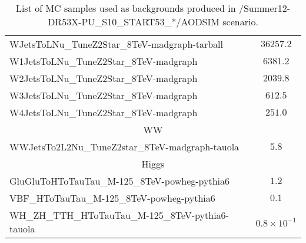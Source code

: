 \begin{table}[!Hhtb]
\begin{center}
{\begin{tabular}{|l|c|}
WJetsToLNu\_TuneZ2Star\_8TeV-madgraph-tarball          &  $36257.2$              \\
W1JetsToLNu\_TuneZ2Star\_8TeV-madgraph         &  $6381.2$               \\
W2JetsToLNu\_TuneZ2Star\_8TeV-madgraph         &  $2039.8$               \\
W3JetsToLNu\_TuneZ2Star\_8TeV-madgraph         &  $612.5$               \\
W4JetsToLNu\_TuneZ2Star\_8TeV-madgraph         &  $251.0$                \\
\hline\hline
\multicolumn{2}{|c|}{WW}\\
\hline\hline
WWJetsTo2L2Nu\_TuneZ2star\_8TeV-madgraph-tauola        &  $5.8$                \\

\hline\hline
\multicolumn{2}{|c|}{Higgs}\\
\hline\hline
GluGluToHToTauTau\_M-125\_8TeV-powheg-pythia6          &  $1.2$                \\
VBF\_HToTauTau\_M-125\_8TeV-powheg-pythia6             &  $0.1$                \\
WH\_ZH\_TTH\_HToTauTau\_M-125\_8TeV-pythia6-tauola     &  $0.8\times10^{-1}$                \\

\hline
\hline

\end{tabular}

}
\end{center}

\caption{List of MC samples used as backgrounds produced in /Summer12-DR53X-PU\_S10\_START53\_*/AODSIM scenario.}
\label{Tab.MCSamples}
\end{table}

